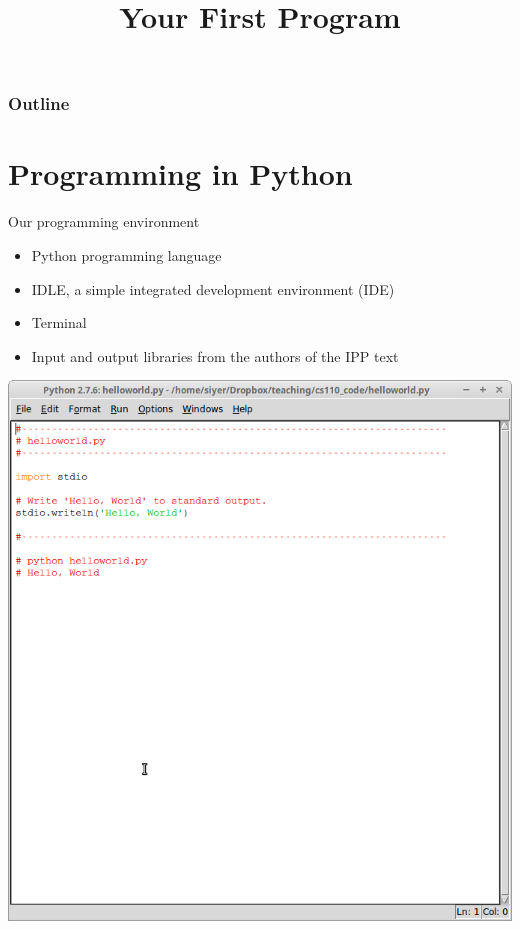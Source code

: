\documentclass[8pt,a4paper,compress]{beamer}
\title{Your First Program}
\date{}
\begin{document}
\begin{frame}
\vfill
\titlepage
\end{frame}

\begin{frame}
\frametitle{Outline}
\tableofcontents
\end{frame}

\section{Programming in Python}
\begin{frame}[fragile]
\begin{minipage}{200pt}
Our programming environment
\begin{itemize}
\item Python programming language  
\item IDLE, a simple integrated development environment (IDE)
\item Terminal
\item Input and output libraries from the authors of the IPP text \end{itemize}
\end{minipage}%
\begin{minipage}{100pt}
\begin{center}
\includegraphics[scale=0.16]{figures/idle.png}


\end{center}
\end{minipage}
\end{frame}
\end{document}
